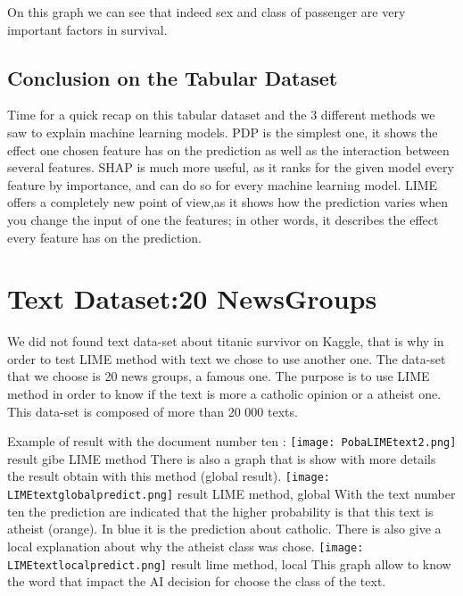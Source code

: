 \documentclass[sigplan,screen]{acmart}
\begin{document}
\Large
On this graph we can see that indeed sex and class of passenger are very important factors in survival.

\subsection{Conclusion on the Tabular Dataset}
Time for a quick recap on this tabular dataset and the 3 different methods we saw to explain machine learning models. PDP is the simplest one, it shows the effect one chosen feature has on the prediction as well as the interaction between several features. SHAP is much more useful, as it ranks for the given model every feature by importance, and can do so for every machine learning model. LIME offers a completely new point of view,as it shows how the prediction varies when you change the input of one the features; in other words, it describes the effect every feature has on the prediction.
\section{Text Dataset:20 NewsGroups}
\Large
We did not found text data-set about titanic survivor on Kaggle, that is why in order to test LIME method with text we chose to use another one. The data-set that we choose is 20 news groups, a famous one. The purpose is to use LIME method in order to know if the text is more a catholic opinion or a atheist one. This data-set is composed of more than 20 000 texts.

Example of result with the document number ten :
\newline
    \centering
        \texttt{[image: PobaLIMEtext2.png]}
        \newline
        \small result gibe LIME method
        \newline
\Larger        
There is also a graph that is show with more details the result obtain with this method (global result).
\newline
    \centering
        \texttt{[image: LIMEtextglobalpredict.png]}
        \small
        result LIME method, global
        \newline
\Large
With the text number ten the prediction are indicated that the higher probability is that this text is atheist (orange). In blue it is the prediction about catholic.
\newline
There is also give a local explanation about why the atheist class was chose.
\newline
    \centering
        \texttt{[image: LIMEtextlocalpredict.png]}
        \small
        result lime method, local
        \newline
\Larger
This graph allow to know the word that impact the AI decision for choose the class of the text. 
\end{document}
